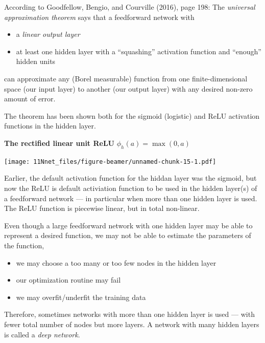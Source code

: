 \documentclass[10pt,ignorenonframetext,]{beamer}
\providecommand{\tightlist}{%
  \setlength{\itemsep}{0pt}\setlength{\parskip}{0pt}}
\begin{document}
\begin{frame}

According to Goodfellow, Bengio, and Courville (2016), page 198: The
\emph{universal approximation theorem} says that a feedforward network
with

\begin{itemize}
\tightlist
\item
  a \emph{linear output layer}
\item
  at least one hidden layer with a ``squashing'' activation function and
  ``enough'' hidden units
\end{itemize}

can approximate any (Borel measurable) function from one
finite-dimensional space (our input layer) to another (our output layer)
with any desired non-zero amount of error.

The theorem has been shown both for the sigmoid (logistic) and ReLU
activation functions in the hidden layer.

\end{frame}

\begin{frame}

\textbf{The rectified linear unit ReLU} \(\phi_h(a)=\max(0,a)\)

\texttt{[image: 11Nnet\_files/figure-beamer/unnamed-chunk-15-1.pdf]}

\end{frame}

\begin{frame}

Earlier, the default activation function for the hiddan layer was the
sigmoid, but now the ReLU is default activiation function to be used in
the hidden layer(s) of a feedforward network --- in particular when more
than one hidden layer is used. The ReLU function is piecewise linear,
but in total non-linear.

\end{frame}

\begin{frame}

Even though a large feedforward network with one hidden layer may be
able to represent a desired function, we may not be able to estimate the
parameters of the function,

\begin{itemize}
\tightlist
\item
  we may choose a too many or too few nodes in the hidden layer
\item
  our optimization routine may fail
\item
  we may overfit/underfit the training data
\end{itemize}

Therefore, sometimes networks with more than one hidden layer is used
--- with fewer total number of nodes but more layers. A network with
many hidden layers is called a \emph{deep network}.

\end{frame}
\end{document}
